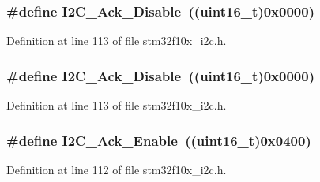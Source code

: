 \subsubsection[{\texorpdfstring{I2\+C\+\_\+\+Ack\+\_\+\+Disable}{I2C_Ack_Disable}}]{\setlength{\rightskip}{0pt plus 5cm}\#define I2\+C\+\_\+\+Ack\+\_\+\+Disable~(({\bf uint16\+\_\+t})0x0000)}\hypertarget{group___i2_c__acknowledgement_gadb5f47c052ac6bae1aa58c724e339e36}{}\label{group___i2_c__acknowledgement_gadb5f47c052ac6bae1aa58c724e339e36}


Definition at line 113 of file stm32f10x\+\_\+i2c.\+h.

\subsubsection[{\texorpdfstring{I2\+C\+\_\+\+Ack\+\_\+\+Disable}{I2C_Ack_Disable}}]{\setlength{\rightskip}{0pt plus 5cm}\#define I2\+C\+\_\+\+Ack\+\_\+\+Disable~(({\bf uint16\+\_\+t})0x0000)}\hypertarget{group___i2_c__acknowledgement_gadb5f47c052ac6bae1aa58c724e339e36}{}\label{group___i2_c__acknowledgement_gadb5f47c052ac6bae1aa58c724e339e36}


Definition at line 113 of file stm32f10x\+\_\+i2c.\+h.

\subsubsection[{\texorpdfstring{I2\+C\+\_\+\+Ack\+\_\+\+Enable}{I2C_Ack_Enable}}]{\setlength{\rightskip}{0pt plus 5cm}\#define I2\+C\+\_\+\+Ack\+\_\+\+Enable~(({\bf uint16\+\_\+t})0x0400)}\hypertarget{group___i2_c__acknowledgement_ga616466f8ef5a47237cdbf7ac578ec507}{}\label{group___i2_c__acknowledgement_ga616466f8ef5a47237cdbf7ac578ec507}


Definition at line 112 of file stm32f10x\+\_\+i2c.\+h.

